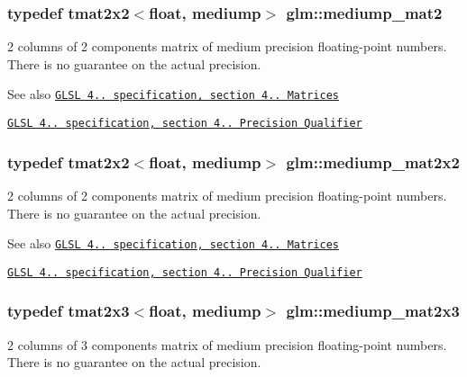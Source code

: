 \subsubsection[{mediump\+\_\+mat2}]{\setlength{\rightskip}{0pt plus 5cm}typedef tmat2x2$<$float, mediump$>$ {\bf glm\+::mediump\+\_\+mat2}}\label{namespaceglm_a62712eb89ac9c8906f6cd76758774b33}
2 columns of 2 components matrix of medium precision floating-\/point numbers. There is no guarantee on the actual precision.

\begin{DoxySeeAlso}{See also}
\href{http://www.opengl.org/registry/doc/GLSLangSpec.4.20.8.pdf}{\tt G\+L\+S\+L 4.. specification, section 4.. Matrices} 

\href{http://www.opengl.org/registry/doc/GLSLangSpec.4.20.8.pdf}{\tt G\+L\+S\+L 4.. specification, section 4.. Precision Qualifier} 
\end{DoxySeeAlso}
\hypertarget{namespaceglm_ad5969af533ebdd30e37827c82420fd65}{}
\subsubsection[{mediump\+\_\+mat2x2}]{\setlength{\rightskip}{0pt plus 5cm}typedef tmat2x2$<$float, mediump$>$ {\bf glm\+::mediump\+\_\+mat2x2}}\label{namespaceglm_ad5969af533ebdd30e37827c82420fd65}
2 columns of 2 components matrix of medium precision floating-\/point numbers. There is no guarantee on the actual precision.

\begin{DoxySeeAlso}{See also}
\href{http://www.opengl.org/registry/doc/GLSLangSpec.4.20.8.pdf}{\tt G\+L\+S\+L 4.. specification, section 4.. Matrices} 

\href{http://www.opengl.org/registry/doc/GLSLangSpec.4.20.8.pdf}{\tt G\+L\+S\+L 4.. specification, section 4.. Precision Qualifier} 
\end{DoxySeeAlso}
\hypertarget{namespaceglm_a51aef59ca67585f2aecfb79b90836fd0}{}
\subsubsection[{mediump\+\_\+mat2x3}]{\setlength{\rightskip}{0pt plus 5cm}typedef tmat2x3$<$float, mediump$>$ {\bf glm\+::mediump\+\_\+mat2x3}}\label{namespaceglm_a51aef59ca67585f2aecfb79b90836fd0}
2 columns of 3 components matrix of medium precision floating-\/point numbers. There is no guarantee on the actual precision.

